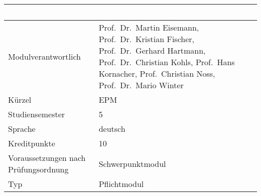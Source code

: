 \begin{longtable}[]{@{}ll@{}}
\toprule
\begin{minipage}[b]{0.12\columnwidth}\raggedright\strut
~\strut
\end{minipage} & \begin{minipage}[b]{0.12\columnwidth}\raggedright\strut
~\strut
\end{minipage}\tabularnewline
\midrule
\endhead
\begin{minipage}[t]{0.12\columnwidth}\raggedright\strut
Modulverantwortlich\strut
\end{minipage} & \begin{minipage}[t]{0.12\columnwidth}\raggedright\strut
Prof.~Dr.~Martin Eisemann, Prof.~Dr.~Kristian Fischer, Prof.~Dr.~Gerhard
Hartmann, Prof.~Dr.~Christian Kohls, Prof.~Hans Kornacher,
Prof.~Christian Noss, Prof.~Dr.~Mario Winter\strut
\end{minipage}\tabularnewline
\begin{minipage}[t]{0.12\columnwidth}\raggedright\strut
Kürzel\strut
\end{minipage} & \begin{minipage}[t]{0.12\columnwidth}\raggedright\strut
EPM\strut
\end{minipage}\tabularnewline
\begin{minipage}[t]{0.12\columnwidth}\raggedright\strut
Studiensemester\strut
\end{minipage} & \begin{minipage}[t]{0.12\columnwidth}\raggedright\strut
5\strut
\end{minipage}\tabularnewline
\begin{minipage}[t]{0.12\columnwidth}\raggedright\strut
Sprache\strut
\end{minipage} & \begin{minipage}[t]{0.12\columnwidth}\raggedright\strut
deutsch\strut
\end{minipage}\tabularnewline
\begin{minipage}[t]{0.12\columnwidth}\raggedright\strut
Kreditpunkte\strut
\end{minipage} & \begin{minipage}[t]{0.12\columnwidth}\raggedright\strut
10\strut
\end{minipage}\tabularnewline
\begin{minipage}[t]{0.12\columnwidth}\raggedright\strut
Voraussetzungen nach Prüfungsordnung\strut
\end{minipage} & \begin{minipage}[t]{0.12\columnwidth}\raggedright\strut
Schwerpunktmodul\strut
\end{minipage}\tabularnewline
\begin{minipage}[t]{0.12\columnwidth}\raggedright\strut
Typ\strut
\end{minipage} & \begin{minipage}[t]{0.12\columnwidth}\raggedright\strut
Pflichtmodul\strut
\end{minipage}\tabularnewline
\bottomrule
\end{longtable}

